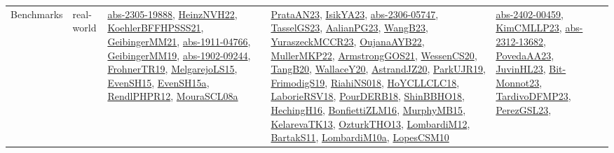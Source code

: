 {\begin{longtable}{lp{3cm}>{\raggedright}p{6cm}>{\raggedright}p{6cm}p{8cm}}
Benchmarks & real-world & \href{articles/abs-2305-19888.pdf}{abs-2305-19888}\cite{abs-2305-19888}, \href{articles/HeinzNVH22.pdf}{HeinzNVH22}\cite{HeinzNVH22}, \href{articles/KoehlerBFFHPSSS21.pdf}{KoehlerBFFHPSSS21}\cite{KoehlerBFFHPSSS21}, \href{papers/GeibingerMM21.pdf}{GeibingerMM21}\cite{GeibingerMM21}, \href{articles/abs-1911-04766.pdf}{abs-1911-04766}\cite{abs-1911-04766}, \href{papers/GeibingerMM19.pdf}{GeibingerMM19}\cite{GeibingerMM19}, \href{articles/abs-1902-09244.pdf}{abs-1902-09244}\cite{abs-1902-09244}, \href{papers/FrohnerTR19.pdf}{FrohnerTR19}\cite{FrohnerTR19}, \href{papers/MelgarejoLS15.pdf}{MelgarejoLS15}\cite{MelgarejoLS15}, \href{papers/EvenSH15.pdf}{EvenSH15}\cite{EvenSH15}, \href{articles/EvenSH15a.pdf}{EvenSH15a}\cite{EvenSH15a}, \href{papers/RendlPHPR12.pdf}{RendlPHPR12}\cite{RendlPHPR12}, \href{papers/MouraSCL08a.pdf}{MouraSCL08a}\cite{MouraSCL08a} & \href{articles/PrataAN23.pdf}{PrataAN23}\cite{PrataAN23}, \href{articles/IsikYA23.pdf}{IsikYA23}\cite{IsikYA23}, \href{articles/abs-2306-05747.pdf}{abs-2306-05747}\cite{abs-2306-05747}, \href{papers/TasselGS23.pdf}{TasselGS23}\cite{TasselGS23}, \href{papers/AalianPG23.pdf}{AalianPG23}\cite{AalianPG23}, \href{papers/WangB23.pdf}{WangB23}\cite{WangB23}, \href{articles/YuraszeckMCCR23.pdf}{YuraszeckMCCR23}\cite{YuraszeckMCCR23}, \href{papers/OujanaAYB22.pdf}{OujanaAYB22}\cite{OujanaAYB22}, \href{articles/MullerMKP22.pdf}{MullerMKP22}\cite{MullerMKP22}, \href{papers/ArmstrongGOS21.pdf}{ArmstrongGOS21}\cite{ArmstrongGOS21}, \href{papers/WessenCS20.pdf}{WessenCS20}\cite{WessenCS20}, \href{papers/TangB20.pdf}{TangB20}\cite{TangB20}, \href{articles/WallaceY20.pdf}{WallaceY20}\cite{WallaceY20}, \href{articles/AstrandJZ20.pdf}{AstrandJZ20}\cite{AstrandJZ20}, \href{papers/ParkUJR19.pdf}{ParkUJR19}\cite{ParkUJR19}, \href{papers/FrimodigS19.pdf}{FrimodigS19}\cite{FrimodigS19}, \href{papers/RiahiNS018.pdf}{RiahiNS018}\cite{RiahiNS018}, \href{papers/HoYCLLCLC18.pdf}{HoYCLLCLC18}\cite{HoYCLLCLC18}, \href{articles/LaborieRSV18.pdf}{LaborieRSV18}\cite{LaborieRSV18}, \href{articles/PourDERB18.pdf}{PourDERB18}\cite{PourDERB18}, \href{articles/ShinBBHO18.pdf}{ShinBBHO18}\cite{ShinBBHO18}, \href{papers/HechingH16.pdf}{HechingH16}\cite{HechingH16}, \href{papers/BonfiettiZLM16.pdf}{BonfiettiZLM16}\cite{BonfiettiZLM16}, \href{papers/MurphyMB15.pdf}{MurphyMB15}\cite{MurphyMB15}, \href{papers/KelarevaTK13.pdf}{KelarevaTK13}\cite{KelarevaTK13}, \href{articles/OzturkTHO13.pdf}{OzturkTHO13}\cite{OzturkTHO13}, \href{articles/LombardiM12.pdf}{LombardiM12}\cite{LombardiM12}, \href{articles/BartakS11.pdf}{BartakS11}\cite{BartakS11}, \href{articles/LombardiM10a.pdf}{LombardiM10a}\cite{LombardiM10a}, \href{articles/LopesCSM10.pdf}{LopesCSM10}\cite{LopesCSM10} & \href{articles/abs-2402-00459.pdf}{abs-2402-00459}\cite{abs-2402-00459}, \href{papers/KimCMLLP23.pdf}{KimCMLLP23}\cite{KimCMLLP23}, \href{articles/abs-2312-13682.pdf}{abs-2312-13682}\cite{abs-2312-13682}, \href{papers/PovedaAA23.pdf}{PovedaAA23}\cite{PovedaAA23}, \href{papers/JuvinHL23.pdf}{JuvinHL23}\cite{JuvinHL23}, \href{papers/Bit-Monnot23.pdf}{Bit-Monnot23}\cite{Bit-Monnot23}, \href{papers/TardivoDFMP23.pdf}{TardivoDFMP23}\cite{TardivoDFMP23}, \href{papers/PerezGSL23.pdf}{PerezGSL23}\cite{PerezGSL23}, 
\end{longtable}}
